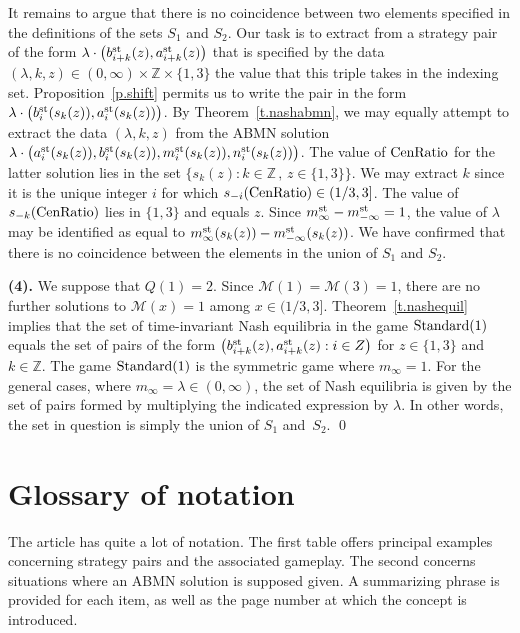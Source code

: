 \documentclass[letterpaper,11pt,oneside,reqno]{amsbook}
\newcommand{\Z}{\ensuremath{\mathbb{Z}}}
\numberwithin{figure}{chapter}
\theoremstyle{definition}
\theoremstyle{definition}
\theoremstyle{definition}
\theoremstyle{definition}
\theoremstyle{definition}
\newcommand{\standard}{{\rm Standard}}
\newcommand{\centralratio}{{\rm CenRatio}}
\newcommand{\asta}{a^{\rm st}}
\newcommand{\bst}{b^{\rm st}}
\newcommand{\mst}{m^{\rm st}}
\newcommand{\nst}{n^{\rm st}}
\newcommand{\minamm}{\mathcal{M}}
\newcommand{\abmnmacspace}{\textrm{ABMN} }
\begin{document}
It remains to argue that there is no coincidence between two elements specified in the definitions of the sets $S_1$ and $S_2$. Our task is to extract from a strategy pair of the form 
$\lambda \cdot \big( \bst_{i+k}(z), \asta_{i+k}(z) \big)$ that is specified by the data $(\lambda,k,z) \in (0,\infty) \times \Z \times \{ 1,3\}$ the value that this triple takes in the indexing set. Proposition~\ref{p.shift} permits us to write the pair in the form $\lambda \cdot \big( \bst_i(s_k(z)), \asta_i(s_k(z)) \big)$. By Theorem~\ref{t.nashabmn}, we may equally attempt to extract the data 
$(\lambda,k,z)$ from the \abmnmacspace solution  $\lambda \cdot \big( \asta_i(s_k(z)), \bst_i(s_k(z)),  \mst_i(s_k(z)), \nst_i(s_k(z)) \big)$. 
The value of $\centralratio$ for the latter solution lies in the set $\big\{ s_k(z): k \in \Z \, , \, z \in \{ 1,3\} \big\}$. We may extract $k$ since it is the unique integer $i$ for which $s_{-i}(\centralratio) \in(1/3,3]$.
The value of $s_{-k}(\centralratio)$ lies in $\{1,3\}$ and equals $z$.  Since $\mst_\infty - \mst_{-\infty} = 1$, the value of $\lambda$ may be identified as equal to $\mst_\infty(s_k(z)) - \mst_{-\infty}(s_k(z))$.
We have confirmed that there is no coincidence between the elements in the union of $S_1$ and $S_2$.



{\bf (4).} We suppose that $Q(1)=2$. Since $\minamm(1)= \minamm(3) = 1$, there are no further solutions to $\minamm(x) = 1$ among $x \in (1/3,3]$. Theorem~\ref{t.nashequil} implies that
the set of time-invariant Nash equilibria in the game $\standard(1)$ equals the set of pairs of the form $\big( \bst_{i+k}(z), \asta_{i+k}(z): i \in Z \big)$ for $z \in \{ 1,3\}$ and $k \in \Z$.
The game $\standard(1)$ is the symmetric game where $m_\infty =1$. For the general cases, where $m_\infty = \lambda \in (0,\infty)$, the set of Nash equilibria is given by the set of pairs formed by multiplying the indicated expression by $\lambda$. In other words, the set in question is simply the union of $S_1$ and~$S_2$. \qed


\chapter{Glossary of notation}\label{s.glossary}


The article has quite a lot of notation. 
The first table offers principal examples concerning strategy pairs and the associated gameplay. The second concerns situations where an \abmnmacspace solution is supposed given. 
A summarizing phrase is provided for each item, as well as the page number at which the concept is introduced.
\end{document}
